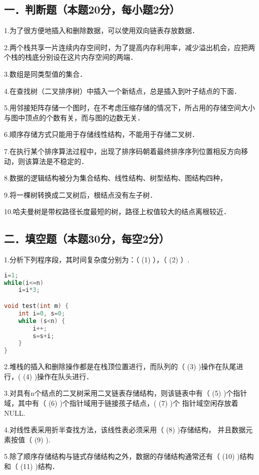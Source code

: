 
\subsection{一．判断题（本题20分，每小题2分）}
1.为了很方便地插入和删除数据，可以使用双向链表存放数据．

2.两个栈共享一片连续内存空间时，为了提高内存利用率，减少溢出机会，应把两个栈的栈底分别设在这片内存空间的两端．

3.数组是同类型值的集合．

4.在查找树（二叉排序树）中插入一个新结点，总是插入到叶子结点的下面．

5.用邻接矩阵存储一个图时，在不考虑压缩存储的情况下，所占用的存储空间大小与图中顶点的个数有关，而与图的边数无关．

6.顺序存储方式只能用于存储线性结构，不能用于存储二叉树．

7.在执行某个排序算法过程中，出现了排序码朝着最终排序序列位置相反方向移动，则该算法是不稳定的．

8.数据的逻辑结构被分为集合结构、线性结构、树型结构、图结构四种，

9.将一棵树转换成二叉树后，根结点没有左子树．

10.哈夫曼树是带权路径长度最短的树，路径上权值较大的结点离根较近．


\subsection{二．填空题（本题30分，每空2分）}
1.分析下列程序段，其时间复杂度分别为：（ (1) ），（ (2) ）.
\begin{lstlisting}[language=cpp]
i=1;
while(i<=n)
    i=i*3;

void test(int m) {
    int i=0, s=0;
    while (s<n) {
        i++;
        s=s+i;
    }
}
\end{lstlisting}

2.堆栈的插入和删除操作都是在栈顶位置进行，而队列的（ (3) )操作在队尾进行，( (4) )操作在队头进行．

3.对具有n个结点的二叉树采用二叉链表存储结构，则该链表中有（ (5) )个指针域，其中有（ (6) )个指针域用于链接孩子结点，( (7) )个 指针域空闲存放着NULL.

4.对线性表采用折半查找方法，该线性表必须采用（ (8) )存储结构， 并且数据元素按值（ (9) ).

5.除了顺序存储结构与链式存储结构之外，数据的存储结构通常还有（ (10) )结构和（ (11) )结构．

